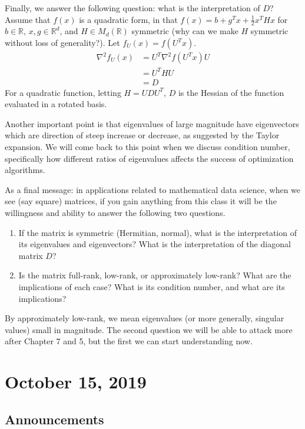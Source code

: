 \documentclass[11pt]{article}
\newcommand{\R}{\ensuremath{\mathbb R}}
\theoremstyle{plain}
\theoremstyle{definition}
\theoremstyle{remark}
\begin{document}
Finally, we answer the following question: what is the interpretation of $D$? Assume that $f(x)$ is a quadratic form, in that $f(x) = b + g^Tx + \frac{1}{2}x^T H x$ for $b \in \R$,  $x, g \in \R^d$, and $H \in M_d(\R)$ symmetric (why can we make $H$ symmetric without loss of generality?). Let $f_U(x) = f(U^T x)$.
\begin{align*}
    \nabla^2 f_U(x) &= U^T \nabla^2 f(U^T x) U\\
    &= U^T H U\\
    &= D
\end{align*}
For a quadratic function, letting $H = UDU^T$, $D$ is the Hessian of the function evaluated in a rotated basis.

Another important point is that eigenvalues of large magnitude have eigenvectors which are direction of steep increase or decrease, as suggested by the Taylor expansion. We will come back to this point when we discuss condition number, specifically how different ratios of eigenvalues affects the success of optimization algorithms. 

As a final message: in applications related to mathematical data science, when we see (say square) matrices, if you gain anything from this class it will be the willingness and ability to answer the following two questions.
\begin{enumerate}
    \item If the matrix is symmetric (Hermitian, normal), what is the  interpretation of its eigenvalues and eigenvectors? What is the interpretation of the diagonal matrix $D$?
    \item Is the matrix full-rank, low-rank, or approximately low-rank? What are the implications of each case? What is its condition number, and what are its implications?
\end{enumerate}

By approximately low-rank, we mean eigenvalues (or more generally, singular values) small in magnitude. The second question we will be able to attack more after Chapter 7 and 5, but the first we can start understanding now. 

\section{October 15, 2019}

\subsection*{Announcements}
\end{document}
